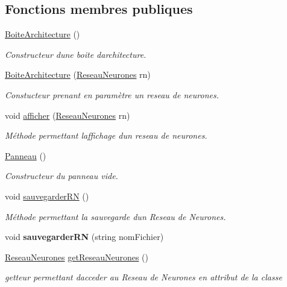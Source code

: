 \subsection*{Fonctions membres publiques}
\begin{DoxyCompactItemize}
\item 
\mbox{\label{classPanneau_a8fb82bab20bdc45acfe9234f3fb9a38e}} 
\hyperlink{classPanneau_a8fb82bab20bdc45acfe9234f3fb9a38e}{Boite\+Architecture} ()
\begin{DoxyCompactList}\small\item\em Constructeur d\textquotesingle{}une boite d\textquotesingle{}architecture. \end{DoxyCompactList}\item 
\hyperlink{classPanneau_a2c86ba058850b199a83eb4a35541531c}{Boite\+Architecture} (\hyperlink{classReseauNeurones}{Reseau\+Neurones} rn)
\begin{DoxyCompactList}\small\item\em Constucteur prenant en paramètre un reseau de neurones. \end{DoxyCompactList}\item 
void \hyperlink{classPanneau_a0990ee55f48bc73a20f9079fa8e2582d}{afficher} (\hyperlink{classReseauNeurones}{Reseau\+Neurones} rn)
\begin{DoxyCompactList}\small\item\em Méthode permettant l\textquotesingle{}affichage d\textquotesingle{}un reseau de neurones. \end{DoxyCompactList}\item 
\mbox{\label{classPanneau_a6d15af2ca1be32f371599285f3edbbcc}} 
\hyperlink{classPanneau_a6d15af2ca1be32f371599285f3edbbcc}{Panneau} ()
\begin{DoxyCompactList}\small\item\em Constructeur du panneau vide. \end{DoxyCompactList}\item 
\mbox{\label{classPanneau_a390b3758b0280bfa67add85464775016}} 
void \hyperlink{classPanneau_a390b3758b0280bfa67add85464775016}{sauvegarder\+RN} ()
\begin{DoxyCompactList}\small\item\em Méthode permettant la sauvegarde d\textquotesingle{}un Reseau de Neurones. \end{DoxyCompactList}\item 
\mbox{\label{classPanneau_a3f7414f7c42e6378fbea049c246db2a9}} 
void {\bfseries sauvegarder\+RN} (string nom\+Fichier)
\item 
\hyperlink{classReseauNeurones}{Reseau\+Neurones} \hyperlink{classPanneau_a8ed7e5db0c0c8a0da729d3c785032643}{get\+Reseau\+Neurones} ()
\begin{DoxyCompactList}\small\item\em getteur permettant d\textquotesingle{}acceder au Reseau de Neurones en attribut de la classe \end{DoxyCompactList}\end{DoxyCompactItemize}


